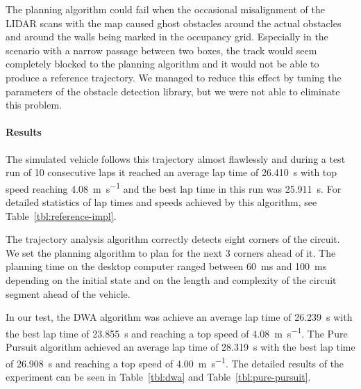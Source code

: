 The planning algorithm could fail when the occasional misalignment of the \gls*{LIDAR} scans with the map caused ghost obstacles around the actual obstacles and around the walls being marked in the occupancy grid. Especially in the scenario with a narrow passage between two boxes, the track would seem completely blocked to the planning algorithm and it would not be able to produce a reference trajectory. We managed to reduce this effect by tuning the parameters of the obstacle detection library, but we were not able to eliminate this problem.

\paragraph{Results}

The simulated vehicle follows this trajectory almost flawlessly and during a test run of 10 consecutive laps it reached an average lap time of \SI{26.410}{\second} with top speed reaching \SI{4.08}{\meter\per\second} and the best lap time in this run was \SI{25.911}{\second}. For detailed statistics of lap times and speeds achieved by this algorithm, see Table~\ref{tbl:reference-impl}.

The trajectory analysis algorithm correctly detects eight corners of the circuit. We set the planning algorithm to plan for the next 3 corners ahead of it. The planning time on the desktop computer ranged between \SI{60}{\milli\second} and \SI{100}{\milli\second} depending on the initial state and on the length and complexity of the circuit segment ahead of the vehicle.

In our test, the \gls*{DWA} algorithm was achieve an average lap time of \SI{26.239}{\s} with the best lap time of \SI{23.855}{\s} and reaching a top speed of \SI{4.08}{\meter\per\second}. The Pure Pursuit algorithm achieved an average lap time of \SI{28.319}{\s} with the best lap time of \SI{26.908}{\s} and reaching a top speed of \SI{4.00}{\meter\per\second}. The detailed results of the experiment can be seen in Table~\ref{tbl:dwa} and Table~\ref{tbl:pure-pursuit}.

